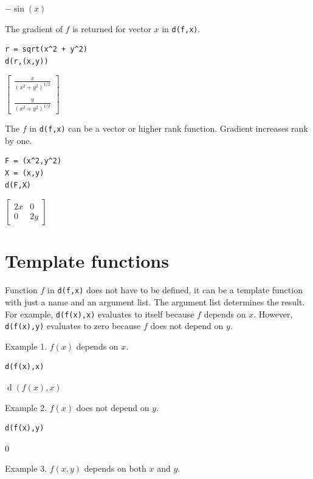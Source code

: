\documentclass[12pt]{article}
\begin{document}
$-\sin(x)$

\bigskip
The gradient of $f$ is returned for vector $x$ in \verb$d(f,x)$.

{\color{blue}
\begin{verbatim}
r = sqrt(x^2 + y^2)
d(r,(x,y))
\end{verbatim}
}

$\displaystyle
\begin{bmatrix}
{\displaystyle \frac{x}{(x^2+y^2)^{1/2}}}
\\
\\
{\displaystyle \frac{y}{(x^2+y^2)^{1/2}}}
\end{bmatrix}
$

\bigskip
The $f$ in \verb$d(f,x)$ can be a vector or higher rank function.
Gradient increases rank by one.

{\color{blue}
\begin{verbatim}
F = (x^2,y^2)
X = (x,y)
d(F,X)
\end{verbatim}
}

$\displaystyle
\begin{bmatrix}
2x & 0
\\[1ex]
0 & 2y
\end{bmatrix}
$

\newpage

\section{Template functions}

Function $f$ in \verb$d(f,x)$ does not have to be defined,
it can be a template function with just a name and an argument list.
The argument list determines the result.
For example, \verb$d(f(x),x)$ evaluates to itself because $f$ depends on $x$.
However, \verb$d(f(x),y)$ evaluates to zero because $f$ does not depend on $y$.

\bigskip
Example 1. $f(x)$ depends on $x$.

{\color{blue}
\begin{verbatim}
d(f(x),x)
\end{verbatim}}

$\operatorname{d}(f(x),x)$

\bigskip
Example 2. $f(x)$ does not depend on $y$.

{\color{blue}
\begin{verbatim}
d(f(x),y)
\end{verbatim}}

$0$

\bigskip
Example 3. $f(x,y)$ depends on both $x$ and $y$.
\end{document}
